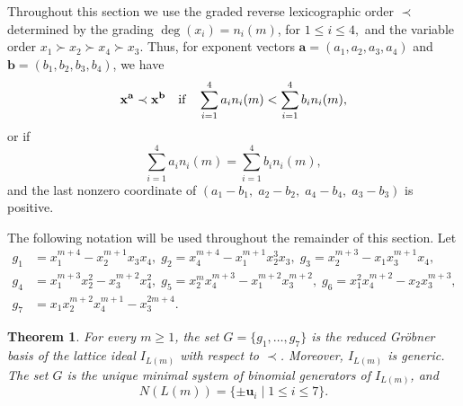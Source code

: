 \documentclass[12pt,a4paper]{amsart}
\newtheorem{theorem}{Theorem}[section]
\theoremstyle{definition}
\begin{document}
Throughout this section we use the graded reverse lexicographic order
$\prec$ determined by the grading
$
\deg(x_i)=n_i(m)$, for $1\le i\le4,$
and the variable order
$
x_1\succ x_2\succ x_4\succ x_3.$
Thus, for exponent vectors
$\mathbf a=(a_1,a_2,a_3,a_4)$ and
$\mathbf b=(b_1,b_2,b_3,b_4)$,
we have
\[
{\bf x}^{\mathbf a}\prec {\bf x}^{\mathbf b}
\quad\text{if}\quad
\sum_{i=1}^4 a_i n_i(m)
<
\sum_{i=1}^4 b_i n_i(m),
\]
or if
\[
\sum_{i=1}^4 a_i n_i(m)
=
\sum_{i=1}^4 b_i n_i(m),
\]
and the last nonzero coordinate of
$
(a_1-b_1,\;a_2-b_2,\;a_4-b_4,\;a_3-b_3)$
is positive.


The following notation will be used throughout the remainder of this
section. Let
\[
\begin{aligned}
g_1&=x_1^{m+4}-x_2^{m+1}x_3x_4, \;
g_2=x_4^{m+4}-x_1^{m+1}x_2^3x_3, \;
g_3=x_2^{m+3}-x_1x_3^{m+1}x_4,\\
g_4&=x_1^{m+3}x_2^2-x_3^{m+2}x_4^2, \;
g_5=x_2^{m}x_4^{m+3}-x_1^{m+2}x_3^{m+2}, \;
g_6=x_1^2x_4^{m+2}-x_2x_3^{m+3},\\
g_7&=x_1x_2^{m+2}x_4^{m+1}-x_3^{2m+4}.
\end{aligned}
\]


\begin{theorem}\label{thm:groebner}
For every $m\ge1$, the set
$
G=\{g_1,\ldots,g_7\}$
is the reduced Gr\"obner basis of the lattice ideal $I_{L(m)}$ with
respect to $\prec$. Moreover, $I_{L(m)}$ is generic. The set $G$ is the unique minimal
system of binomial generators of $I_{L(m)}$, and
\[
N(L(m))
=
\{\pm\mathbf u_i\mid1\le i\le7\}.
\]
\end{theorem}
\end{document}
